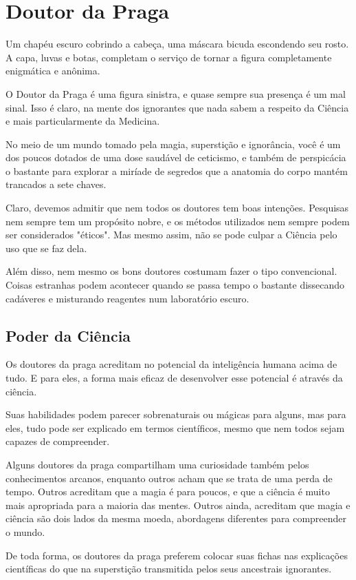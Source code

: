 \documentclass[letterpaper,twocolumn,openany]{dndbook}
\begin{document}
	\section{Doutor da Praga}
	
	Um chapéu escuro cobrindo a cabeça, uma máscara bicuda escondendo seu rosto. A capa, luvas e botas, completam o serviço de tornar a figura completamente enigmática e anônima.
	
	O Doutor da Praga é uma figura sinistra, e quase sempre sua presença é um mal sinal. Isso é claro, na mente dos ignorantes que nada sabem a respeito da Ciência e mais particularmente da Medicina.
	
	No meio de um mundo tomado pela magia, superstição e  ignorância, você é um dos poucos dotados de uma dose saudável de ceticismo, e também de perspicácia o bastante para explorar a miríade de segredos que a anatomia do corpo mantém trancados a sete chaves.
	
	Claro, devemos admitir que nem todos os doutores tem boas intenções. Pesquisas nem sempre tem um propósito nobre, e os métodos utilizados nem sempre podem ser considerados "éticos". Mas mesmo assim, não se pode culpar a Ciência pelo uso que se faz dela.
	
	Além disso, nem mesmo os bons doutores costumam fazer o tipo convencional. Coisas estranhas podem acontecer quando se passa tempo o bastante dissecando cadáveres e misturando reagentes num laboratório escuro.
	
	\subsection{Poder da Ciência}
	Os doutores da praga acreditam no potencial da inteligência humana acima de tudo. E para eles, a forma mais eficaz de desenvolver esse potencial é através da ciência.
	
	Suas habilidades podem parecer sobrenaturais ou mágicas para alguns, mas para eles, tudo pode ser explicado em termos científicos, mesmo que nem todos sejam capazes de compreender.
	
	Alguns doutores da praga compartilham uma curiosidade também pelos conhecimentos arcanos, enquanto outros acham que se trata de uma perda de tempo. Outros acreditam que a magia é para poucos, e que a ciência é muito mais apropriada para a maioria das mentes. Outros ainda, acreditam que magia e ciência são dois lados da mesma moeda, abordagens diferentes para compreender o mundo.
	
	De toda forma, os doutores da praga preferem colocar suas fichas nas explicações científicas do que na superstição transmitida pelos seus ancestrais ignorantes.
\end{document}
